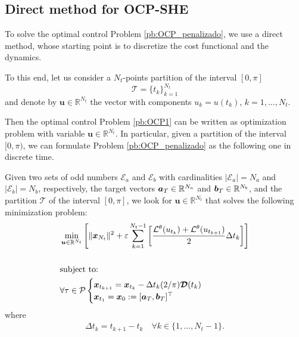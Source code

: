 \documentclass[twocolumn]{autart}    %
\begin{document}
\subsection{Direct method  for OCP-SHE}

To solve the optimal control Problem \ref{pb:OCP_penalizado}, we use a direct method, whose starting point is to discretize the cost functional and the dynamics.

To this end, let us consider a $N_t$-points partition of the interval $[0,\pi]$ 
\begin{displaymath} 
	\mathcal{T} = \{t_k\}_{k=1}^{N_t} 
\end{displaymath}
and denote by $\bm{u} \in \mathbb{R}^{N_t}$ the vector with components $u_k = u(t_k)$, $k=1,\ldots,N_t$.

Then the optimal control Problem \ref{pb:OCP1} can be written as optimization problem with variable $\bm{u} \in \mathbb{R}^{N_t}$. In particular, given a partition of the interval $[0,\pi)$, we can formulate Problem \ref{pb:OCP_penalizado} as the following one in discrete time.
\newline

\begin{problem}\label{pb:numOCP2}
Given two sets of odd numbers $\mathcal{E}_a$ and $\mathcal{E}_b$ with cardinalities $|\mathcal{E}_a| = N_a$ and $|\mathcal{E}_b| = N_b$, respectively, the target vectors $\bm{a}_T \in \mathbb{R}^{N_a}$ and $\bm{b}_T \in \mathbb{R}^{N_b}$, and the partition $\mathcal{T}$ of the interval $[0,\pi]$, we look for $\bm{u} \in \mathbb{R}^{N_t}$ that solves the following minimization problem:
\begin{align*}
	&\min_{\bm{u} \in \mathbb{R}^{N_t}} \Bigg[\| \bm{x}_{N_t}\|^2 + \varepsilon \sum_{k=1}^{N_t-1} 
	\bigg[\frac{\mathcal{L}^\theta(u_{t_k}) + \mathcal{L}^\theta(u_{t_{k+1}})}{2}\Delta t_k \bigg]  \Bigg]  
	\\[15pt]
    &\notag \text{subject to: } 
    \\
    &\forall \tau \in \mathcal{P} \begin{cases}
    \bm{x}_{t_{k+1}} = \bm{x}_{t_k} - \Delta t_{k} (2/\pi) \bm{\mathcal{D}}(t_k)\\
    \bm{x}_{t_1} = \bm{x}_0:= [\bm{a}_T,\bm{b}_T]^\top
    \end{cases} 
\end{align*}
where 
\begin{gather}
	\Delta t_{k} = t_{k+1} - t_{k} \hspace{1em} \forall k \in \{1,\dots,N_t-1\}.
\end{gather}
\end{problem}
\end{document}
